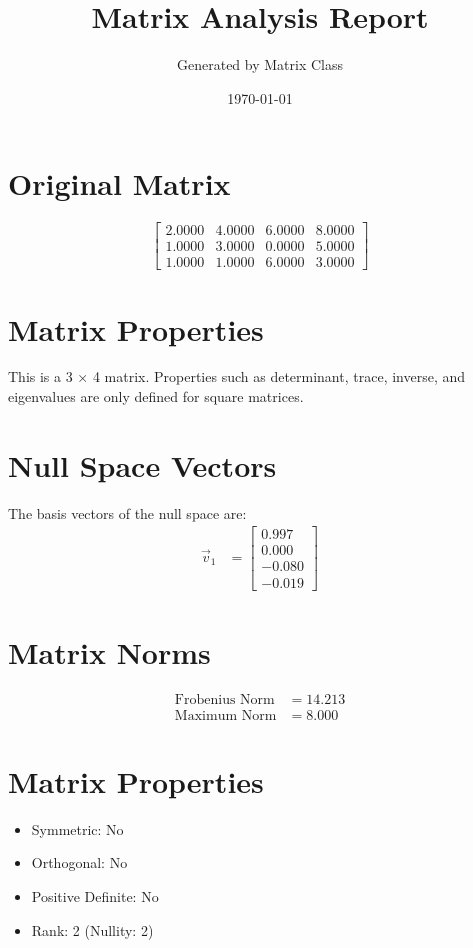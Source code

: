\documentclass{article}
\title{\color{Othertext}Matrix Analysis Report}
\author{\color{Othertext}Generated by Matrix Class}
\begin{document}
\date{\color{Othertext}\today}
\maketitle


\section{Original Matrix}
\[
\begin{bmatrix}
2.0000 & 4.0000 & 6.0000 & 8.0000 \\
1.0000 & 3.0000 & 0.0000 & 5.0000 \\
1.0000 & 1.0000 & 6.0000 & 3.0000
\end{bmatrix}
\]

\section{Matrix Properties}
This is a 3 × 4 matrix.
Properties such as determinant, trace, inverse, and eigenvalues are only defined for square matrices.

\section{Null Space Vectors}
The basis vectors of the null space are:
\[
\begin{aligned}
\vec{v}_1 &= \begin{bmatrix}
0.997 \\
0.000 \\
-0.080 \\
-0.019\end{bmatrix}
\end{aligned}
\]

\section{Matrix Norms}
\begin{align*}
\text{Frobenius Norm} &= 14.213\\
\text{Maximum Norm} &= 8.000
\end{align*}

\section{Matrix Properties}
\begin{itemize}
\item Symmetric: No
\item Orthogonal: No
\item Positive Definite: No
\item Rank: 2 (Nullity: 2)
\end{itemize}
\end{document}
